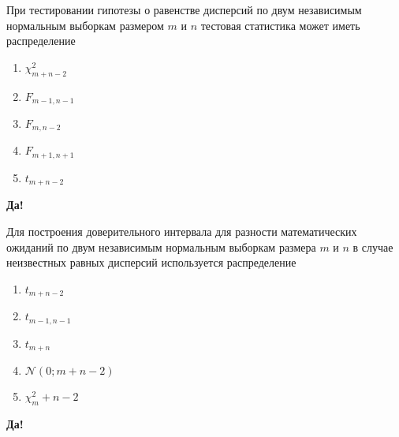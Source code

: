 \documentclass[t]{beamer}
\newcommand{\cN}{\mathcal{N}}
\begin{document}
 \begin{frame} \label{1-Yes} 
\begin{block}{1} 

  При тестировании гипотезы о равенстве дисперсий по двум независимым нормальным выборкам размером $m$ и $n$ тестовая статистика может иметь распределение


 \end{block} 
\begin{enumerate} 
\item[] \hyperlink{1-No}{\beamergotobutton{} $\chi^2_{m+n-2}$}
\item[] \hyperlink{1-Yes}{\beamergotobutton{} $F_{m-1,n-1}$}
\item[] \hyperlink{1-No}{\beamergotobutton{} $F_{m,n - 2}$}
\item[] \hyperlink{1-No}{\beamergotobutton{} $F_{m+1,n+1}$}
\item[] \hyperlink{1-No}{\beamergotobutton{} $t_{m+n-2}$}
\end{enumerate} 

 \textbf{Да!} 
 \hyperlink{2}{}\end{frame} 


 \begin{frame} \label{2-Yes} 
\begin{block}{2} 

  Для построения доверительного интервала для разности математических ожиданий по двум независимым нормальным выборкам размера $m$ и $n$ в случае неизвестных равных дисперсий используется распределение


 \end{block} 
\begin{enumerate} 
\item[] \hyperlink{2-Yes}{\beamergotobutton{} $t_{m+n-2}$}
\item[] \hyperlink{2-No}{\beamergotobutton{} $t_{m-1,n-1}$}
\item[] \hyperlink{2-No}{\beamergotobutton{} $t_{m+n}$}
\item[] \hyperlink{2-No}{\beamergotobutton{} $\cN(0;m+n-2)$}
\item[] \hyperlink{2-No}{\beamergotobutton{} $\chi^2_m+n-2$}
\end{enumerate} 

 \textbf{Да!} 
 \hyperlink{3}{}\end{frame} 
\end{document}

